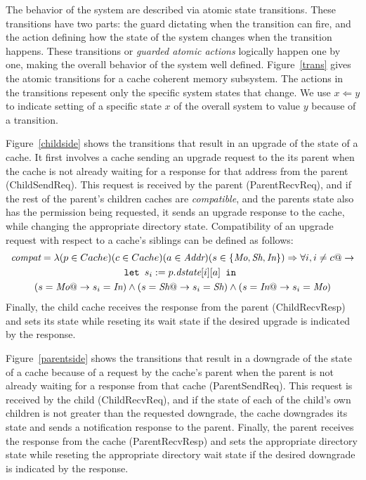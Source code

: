 
The behavior of the system are described via atomic state transitions.
These transitions have two parts: the guard dictating when the
transition can fire, and the action defining how the state of the
system changes when the transition happens. These transitions or \emph{guarded
atomic actions} logically happen one by one, making the overall behavior of the
system well defined. Figure~\ref{trans} gives the atomic transitions for a
cache coherent memory subsystem. The actions in the transitions repesent only
the specific system states that change. We use $x \Leftarrow y$ to indicate
setting of a specific state $x$ of the overall system to value $y$ because of a
transition.

Figure~\ref{childside} shows the transitions that result in an upgrade of the
state of a cache. It first involves a cache sending an upgrade request to the
its parent when the cache is not already waiting for a response for that
address from the parent (ChildSendReq). This request is received by the parent
(ParentRecvReq), and if the rest of the parent's children caches are
\emph{compatible}, and the parents state also has the permission being
requested, it sends an upgrade response to the cache, while changing the
appropriate directory state. Compatibility of an upgrade request with respect
to a cache's siblings can be defined as follows:
\begin{multline*}
\textit{compat} = \lambda (p \in Cache) (c \in Cache) (a \in \textit{Addr}) (s \in \{\textit{Mo}, \textit{Sh}, \textit{In}\}) \Rightarrow \forall i, i \ne c @-> \\
\texttt{let } s_i := p.\textit{dstate}[i][a] \texttt{ in }\\
 (s = \textit{Mo} @-> s_i = \textit{In}) \wedge (s = \textit{Sh} @-> s_i = \textit{Sh}) \wedge (s = \textit{In} @-> s_i = \textit{Mo})
\end{multline*}
Finally, the child cache receives the response from the parent (ChildRecvResp)
and sets its state while reseting its wait state if the desired upgrade is
indicated by the response.

Figure~\ref{parentside} shows the transitions that result in a downgrade of the
state of a cache because of a request by the cache's parent when the parent is
not already waiting for a response from that cache (ParentSendReq).  This
request is received by the child (ChildRecvReq), and if the state of each of
the child's own children is not greater than the requested downgrade, the cache
downgrades its state and sends a notification response to the parent. Finally,
the parent receives the response from the cache (ParentRecvResp) and sets the
appropriate directory state while reseting the appropriate directory wait state
if the desired downgrade is indicated by the response.

